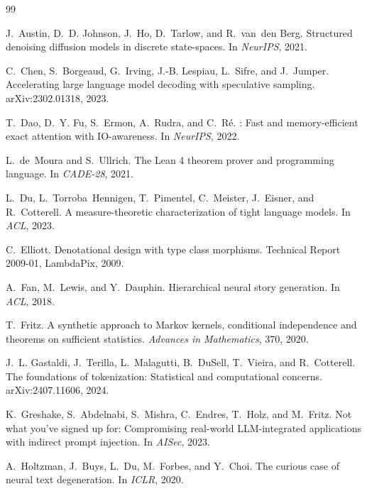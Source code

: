 \documentclass[10pt]{article}
\theoremstyle{qpt}
\begin{document}
\begin{thebibliography}{99}\small

J.~Austin, D.~D. Johnson, J.~Ho, D.~Tarlow, and R.~van~den Berg.
\newblock Structured denoising diffusion models in discrete state-spaces.
\newblock In \emph{NeurIPS}, 2021.

C.~Chen, S.~Borgeaud, G.~Irving, J.-B. Lespiau, L.~Sifre, and J.~Jumper.
\newblock Accelerating large language model decoding with speculative sampling.
\newblock arXiv:2302.01318, 2023.

T.~Dao, D.~Y. Fu, S.~Ermon, A.~Rudra, and C.~R{\'e}.
: Fast and memory-efficient exact attention with {IO}-awareness.
\newblock In \emph{NeurIPS}, 2022.

L.~de~Moura and S.~Ullrich.
\newblock The {Lean} 4 theorem prover and programming language.
\newblock In \emph{CADE-28}, 2021.

L.~Du, L.~Torroba~Hennigen, T.~Pimentel, C.~Meister, J.~Eisner, and R.~Cotterell.
\newblock A measure-theoretic characterization of tight language models.
\newblock In \emph{ACL}, 2023.

C.~Elliott.
\newblock Denotational design with type class morphisms.
\newblock Technical Report 2009-01, LambdaPix, 2009.

A.~Fan, M.~Lewis, and Y.~Dauphin.
\newblock Hierarchical neural story generation.
\newblock In \emph{ACL}, 2018.

T.~Fritz.
\newblock A synthetic approach to {Markov} kernels, conditional independence and theorems on sufficient statistics.
\newblock \emph{Advances in Mathematics}, 370, 2020.

J.~L. Gastaldi, J.~Terilla, L.~Malagutti, B.~DuSell, T.~Vieira, and R.~Cotterell.
\newblock The foundations of tokenization: Statistical and computational concerns.
\newblock arXiv:2407.11606, 2024.

K.~Greshake, S.~Abdelnabi, S.~Mishra, C.~Endres, T.~Holz, and M.~Fritz.
\newblock Not what you've signed up for: Compromising real-world {LLM}-integrated applications with indirect prompt injection.
\newblock In \emph{AISec}, 2023.

A.~Holtzman, J.~Buys, L.~Du, M.~Forbes, and Y.~Choi.
\newblock The curious case of neural text degeneration.
\newblock In \emph{ICLR}, 2020.


\end{thebibliography}
\end{document}
